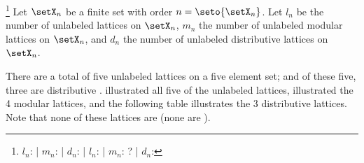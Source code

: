 \begin{proposition}
\footnote{
  $l_n$:  | %
  $m_n$:  | %
  $d_n$:  | %
  $l_n$:  | %
  $m_n$: ? | %
  $d_n$:  %
  }
\label{prop:lat_num_ldm}
Let $\setX_n$ be a finite set with order $n=\seto{\setX_n}$.
Let $l_n$ be the number of unlabeled lattices on $\setX_n$,
    $m_n$ the number of unlabeled modular lattices on $\setX_n$,
and $d_n$ the number of unlabeled distributive lattices on $\setX_n$.
\end{proposition}



\begin{example}
\label{ex:lat_set5_distrib}
There are a total of five unlabeled lattices on a five element set;
and of these five, three are distributive .
 illustrated all five of the unlabeled lattices,
 illustrated the 4 modular lattices,
and the following table illustrates the 3 distributive lattices.
Note that none of these lattices are 
(none are ).
\end{example}


